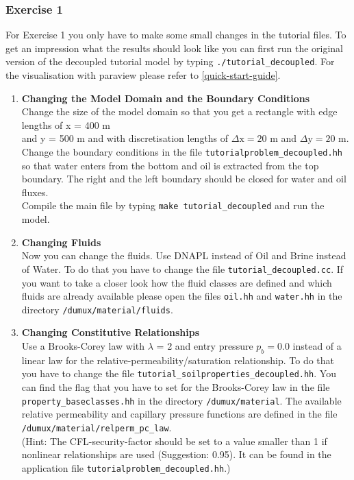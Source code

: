 \subsubsection{Exercise 1}
\renewcommand{\labelenumi}{\alph{enumi})}
For Exercise 1 you only have to make some small changes in the tutorial files.
To get an impression what the results should look like you can first run the original version of the decoupled tutorial model by typing  \texttt{./tutorial\_decoupled}. For the visualisation with paraview please refer to \ref{quick-start-guide}.
\begin{enumerate}
\item \textbf{Changing the Model Domain and the Boundary Conditions} \\
Change the size of the model domain so that you get a rectangle
with edge lengths of x = 400 m \\  and y = 500 m and with discretisation lengths of  $\Delta \text{x} = 20$ m and $\Delta \text{y} = 20$ m. \\
Change the boundary conditions in the file \texttt{tutorialproblem\_decoupled.hh} so that water enters from the bottom and oil is extracted from the top boundary. The right and the left boundary should be closed for water and oil fluxes.  \\
Compile the main file by typing \texttt{make tutorial\_decoupled} and run the model.

\item \textbf{Changing Fluids} \\
Now you can change the fluids. Use DNAPL instead of Oil and Brine instead of Water. To do that you have to change the file \texttt{tutorial\_decoupled.cc}. If you want to take a closer look how the fluid classes are defined and which fluids are already available please open the files \texttt{oil.hh} and \texttt{water.hh} in the directory
\texttt{/dumux/material/fluids}.

\item \textbf{Changing Constitutive Relationships} \\
Use a Brooks-Corey law with $\lambda$ = 2 and entry pressure $p_b = 0.0$ instead of a linear law for the relative-permeability/saturation relationship. To do that you have to change the file \texttt{tutorial\_soilproperties\_decoupled.hh}. You can find the flag that you have to set for the Brooks-Corey law in the file \texttt{property\_baseclasses.hh} in the directory \texttt{/dumux/material}.  
The available relative permeability and capillary pressure functions are defined in the file \texttt{/dumux/material/relperm\_pc\_law}.\\
(Hint: The CFL-security-factor should be set to a value smaller than 1 if nonlinear relationships are used (Suggestion: 0.95). It can be found in the application file \texttt{tutorialproblem\_decoupled.hh}.)
 

\end{enumerate}
